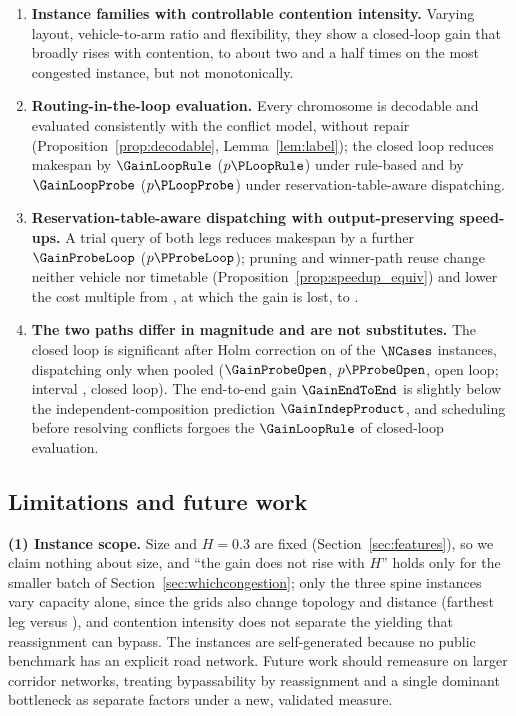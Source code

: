 \begin{enumerate}[leftmargin=*,topsep=2pt,itemsep=2pt]
\item \textbf{Instance families with controllable contention intensity.} Varying layout, vehicle-to-arm ratio and flexibility, they show a closed-loop gain that broadly rises with contention, to about two and a half times on the most congested instance, but not monotonically.
\item \textbf{Routing-in-the-loop evaluation.} Every chromosome is decodable and evaluated consistently with the conflict model, without repair (Proposition~\ref{prop:decodable}, Lemma~\ref{lem:label}); the closed loop reduces makespan by $\GainLoopRule$ ($p\PLoopRule$) under rule-based and by $\GainLoopProbe$ ($p\PLoopProbe$) under reservation-table-aware dispatching.
\item \textbf{Reservation-table-aware dispatching with output-preserving speed-ups.} A trial query of both legs reduces makespan by a further $\GainProbeLoop$ ($p\PProbeLoop$); pruning and winner-path reuse change neither vehicle nor timetable (Proposition~\ref{prop:speedup_equiv}) and lower the cost multiple from \CostMultBefore{}, at which the gain is lost, to \CostMultAfter{}.
\item \textbf{The two paths differ in magnitude and are not substitutes.} The closed loop is significant after Holm correction on \CellsSigLoopAdj{} of the $\NCases$ instances, dispatching only when pooled ($\GainProbeOpen$, $p\PProbeOpen$, open loop; interval \CIProbeLoop{}, closed loop). The end-to-end gain $\GainEndToEnd$ is slightly below the independent-composition prediction $\GainIndepProduct$, and scheduling before resolving conflicts forgoes the $\GainLoopRule$ of closed-loop evaluation.
\end{enumerate}

\subsection{Limitations and future work}
\label{sec:limitations}
\label{sec:future_work}

\textbf{(1) Instance scope.}
Size and $H=0.3$ are fixed (Section~\ref{sec:features}), so we claim nothing about size, and ``the gain does not rise with $H$'' holds only for the smaller batch of Section~\ref{sec:whichcongestion}; only the three spine instances vary capacity alone, since the grids also change topology and distance (farthest leg \LegDumbbell{} versus \LegGrid{}), and contention intensity does not separate the yielding that reassignment can bypass. The instances are self-generated because no public benchmark has an explicit road network. Future work should remeasure on larger corridor networks, treating bypassability by reassignment and a single dominant bottleneck as separate factors under a new, validated measure.

